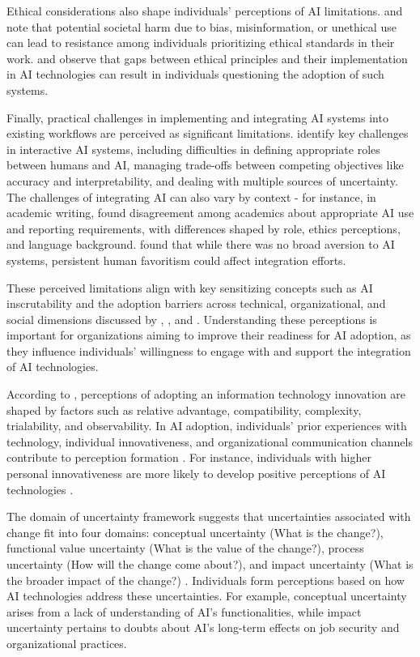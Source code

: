 Ethical considerations also shape individuals' perceptions of AI limitations. \cite{Whittle2021} and \cite{Aliman2021} note that potential societal harm due to bias, misinformation, or unethical use can lead to resistance among individuals prioritizing ethical standards in their work. \cite{zhang2024symlearn} and \cite{Fang2023} observe that gaps between ethical principles and their implementation in AI technologies can result in individuals questioning the adoption of such systems.

Finally, practical challenges in implementing and integrating AI systems into existing workflows are perceived as significant limitations. \cite{Boukhelifa2020} identify key challenges in interactive AI systems, including difficulties in defining appropriate roles between humans and AI, managing trade-offs between competing objectives like accuracy and interpretability, and dealing with multiple sources of uncertainty. The challenges of integrating AI can also vary by context - for instance, in academic writing, \cite{Chemaya2024} found disagreement among academics about appropriate AI use and reporting requirements, with differences shaped by role, ethics perceptions, and language background. \cite{zhang2023human} found that while there was no broad aversion to AI systems, persistent human favoritism could affect integration efforts.

These perceived limitations align with key sensitizing concepts such as AI inscrutability and the adoption barriers across technical, organizational, and social dimensions discussed by \cite{Weber2023}, \cite{Cubric2020}, and \cite{Agrawal2024}. Understanding these perceptions is important for organizations aiming to improve their readiness for AI adoption, as they influence individuals' willingness to engage with and support the integration of AI technologies.

According to \cite{Moore1991}, perceptions of adopting an information technology innovation are shaped by factors such as relative advantage, compatibility, complexity, trialability, and observability. In AI adoption, individuals' prior experiences with technology, individual innovativeness, and organizational communication channels contribute to perception formation \citep{Agarwal1998,Haenssgen2018}. For instance, individuals with higher personal innovativeness are more likely to develop positive perceptions of AI technologies \cite{Agarwal1998}.

The domain of uncertainty framework suggests that uncertainties associated with change fit into four domains: conceptual uncertainty (What is the change?), functional value uncertainty (What is the value of the change?), process uncertainty (How will the change come about?), and impact uncertainty (What is the broader impact of the change?) \citep{Yin2024}. Individuals form perceptions based on how AI technologies address these uncertainties. For example, conceptual uncertainty arises from a lack of understanding of AI's functionalities, while impact uncertainty pertains to doubts about AI's long-term effects on job security and organizational practices.


